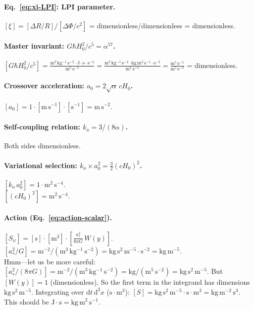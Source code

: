 \documentclass[11pt]{article}
\newcommand{\dd}{\mathrm{d}}
\begin{document}
\paragraph{Eq.~\eqref{eq:xi-LPI}: LPI parameter.}
$[\xi] = [\Delta R/R]/[\Delta\Phi/c^2]$ = dimensionless/dimensionless
= dimensionless. \checkmark

\paragraph{Master invariant: $G\hbar H_0^2/c^5 = \alpha^{57}$.}
$[G\hbar H_0^2/c^5]
= \frac{\mathrm{m^3\,kg^{-1}\,s^{-2}}\cdot\mathrm{J\cdot s}\cdot\mathrm{s}^{-2}}{\mathrm{m^5\,s^{-5}}}
= \frac{\mathrm{m^3\,kg^{-1}\,s^{-2}\cdot kg\,m^2\,s^{-1}\cdot s^{-2}}}{\mathrm{m^5\,s^{-5}}}
= \frac{\mathrm{m^5\,s^{-5}}}{\mathrm{m^5\,s^{-5}}}$
= dimensionless. \checkmark

\paragraph{Crossover acceleration: $a_0 = 2\sqrt{\alpha}\,cH_0$.}
$[a_0] = 1\cdot[\mathrm{m\,s^{-1}}]\cdot[\mathrm{s}^{-1}]
= \mathrm{m\,s}^{-2}$. \checkmark

\paragraph{Self-coupling relation: $k_a = 3/(8\alpha)$.}
Both sides dimensionless. \checkmark

\paragraph{Variational selection: $k_a\times a_0^2 = \frac{3}{2}(cH_0)^2$.}
$[k_a\, a_0^2] = 1\cdot\mathrm{m^2\,s^{-4}}$.\\
$[(cH_0)^2] = \mathrm{m^2\,s^{-4}}$. \checkmark

\paragraph{Action (Eq.~\eqref{eq:action-scalar}).}
$[S_\psi] = [\mathrm{s}]\cdot[\mathrm{m}^3]\cdot\left[\frac{a_*^2}{8\pi G}\,W(y)\right]$.\\
$[a_*^2/G] = \mathrm{m^{-2}}/(\mathrm{m^3\,kg^{-1}\,s^{-2}})
= \mathrm{kg\,s^2\,m^{-5}} \cdot \mathrm{s^{-2}} = \mathrm{kg\,m^{-5}}$.\\
Hmm---let us be more careful: $[a_*^2/(8\pi G)] = \mathrm{m}^{-2}/(\mathrm{m^3\,kg^{-1}\,s^{-2}})
= \mathrm{kg/(m^5\,s^{-2})} = \mathrm{kg\,s^2\,m^{-5}}$.  But $[W(y)] = 1$ (dimensionless).
So the first term in the integrand has dimensions $\mathrm{kg\,s^2\,m^{-5}}$.
Integrating over $\dd t\,\dd^3x$ ($\mathrm{s\cdot m^3}$):
$[S] = \mathrm{kg\,s^2\,m^{-5}}\cdot\mathrm{s\cdot m^3} = \mathrm{kg\,m^{-2}\,s^3}$.
This should be $\mathrm{J\cdot s} = \mathrm{kg\,m^2\,s^{-1}}$.
\end{document}
